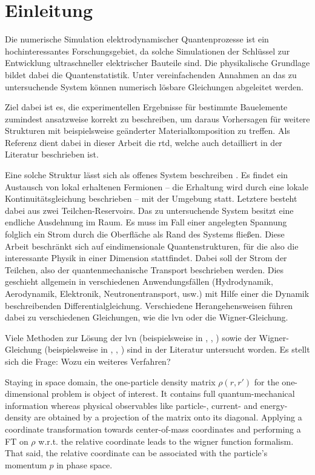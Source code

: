 \chapter{Einleitung}
\label{chap:einleitung}
Die numerische Simulation elektrodynamischer Quantenprozesse ist ein hochinteressantes Forschungsgebiet, da solche Simulationen der Schlüssel zur Entwicklung ultraschneller elektrischer Bauteile sind. Die physikalische Grundlage bildet dabei die Quantenstatistik. Unter vereinfachenden Annahmen an das zu untersuchende System können numerisch lösbare Gleichungen abgeleitet werden. 

Ziel dabei ist es, die experimentellen Ergebnisse für bestimmte Bauelemente zumindest ansatzweise korrekt zu beschreiben, um daraus Vorhersagen für weitere Strukturen mit beispielsweise geänderter Materialkomposition zu treffen. Als Referenz dient dabei in dieser Arbeit die \ac{rtd}, welche auch detailliert in der Literatur \cite{wiedenhaus} beschrieben ist.

Eine solche Struktur lässt sich als offenes System beschreiben \cite{frensley}. Es findet ein Austausch von lokal erhaltenen Fermionen -- die Erhaltung wird durch eine lokale Kontinuitätsgleichung beschrieben -- mit der Umgebung statt. Letztere besteht dabei aus zwei Teilchen-Reservoirs. Das zu untersuchende System besitzt eine endliche Ausdehnung im Raum. Es muss im Fall einer angelegten Spannung folglich ein Strom durch die Oberfläche als Rand des Systems fließen. Diese Arbeit beschränkt sich auf eindimensionale Quantenstrukturen, für die also die interessante Physik in einer Dimension stattfindet. Dabei soll der Strom der Teilchen, also der quantenmechanische Transport beschrieben werden. Dies geschieht allgemein in verschiedenen Anwendungsfällen (Hydrodynamik, Aerodynamik, Elektronik, Neutronentransport, usw.) mit Hilfe einer die Dynamik beschreibenden Differentialgleichung. Verschiedene Herangehensweisen führen dabei zu verschiedenen Gleichungen, wie die \ac{lvn} oder die Wigner-Gleichung.

Viele Methoden zur Lösung der \ac{lvn}  (beispielsweise in \cite{frenslely2}, \cite{lukas1}, \cite{}) sowie der Wigner-Gleichung (beispielsweise in \cite{rossi1994monte}, \cite{ringhofer}, \cite{van2017efficient}) sind in der Literatur untersucht worden. Es stellt sich die Frage: Wozu ein weiteres Verfahren?

Staying in space domain, the one-particle density matrix $\rho(r,r')$ for the one-dimensional problem is object of interest. It contains full quantum-mechanical information whereas physical observables like particle-, current- and energy-density are obtained by a projection of the matrix onto its diagonal. Applying a coordinate transformation towards center-of-mass coordinates and performing a FT on $\rho$ w.r.t. the relative coordinate leads to the wigner function formalism. That said, the relative coordinate can be associated with the particle's momentum $p$ in phase space.

